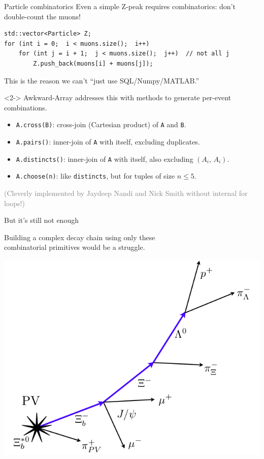 \documentclass[aspectratio=169]{beamer}
\begin{document}
\begin{frame}[fragile]{Particle combinatorics}
\large
\vspace{0.35 cm}
Even a simple Z-peak requires combinatorics: don't double-count the muons!

\normalsize
\begin{verbatim}
std::vector<Particle> Z;
for (int i = 0;  i < muons.size();  i++)
    for (int j = i + 1;  j < muons.size();  j++)  // not all j
        Z.push_back(muons[i] + muons[j]);
\end{verbatim}

\large
This is the reason we can't ``just use SQL/Numpy/MATLAB.''

\vspace{0.25 cm}
\begin{uncoverenv}<2->
Awkward-Array addresses this with methods to generate per-event combinations.
\begin{itemize}
\item \texttt{A.cross(B)}: cross-join (Cartesian product) of \texttt{A} and \texttt{B}.
\item \texttt{A.pairs()}: inner-join of \texttt{A} with itself, excluding duplicates.
\item \texttt{A.distincts()}: inner-join of \texttt{A} with itself, also excluding $(A_i\mbox{, }A_i)$.
\item \texttt{A.choose(n)}: like \texttt{distincts}, but for tuples of size $n \le 5$.
\end{itemize}

\vspace{0.25 cm}
\textcolor{gray}{\normalsize (Cleverly implemented by Jaydeep Nandi and Nick Smith without internal for loops!)}
\vspace{0.1 cm}
\end{uncoverenv}
\end{frame}

\begin{frame}{But it's still not enough}
\Large
\vspace{0.25 cm}
\begin{center}
Building a complex decay chain using only these \\ combinatorial primitives would be a struggle.

\vspace{0.5 cm}
\includegraphics[width=0.5\linewidth]{decay-chain.png}
\end{center}
\end{frame}
\end{document}
